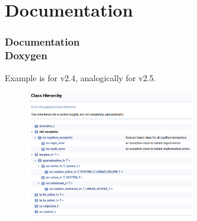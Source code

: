 \documentclass[ucs,10pt]{beamer}
\begin{document}
\section{Documentation}

\begin{frame}
\frametitle{Documentation \\
        \small \color{rwth-blue} Doxygen}
	Example is for v2.4, analogically for v2.5.
        \begin{figure}
		\includegraphics[width=0.65\textwidth]{figures/class_hierarchy_doc.png}                
        \end{figure}
\end{frame}
\end{document}
